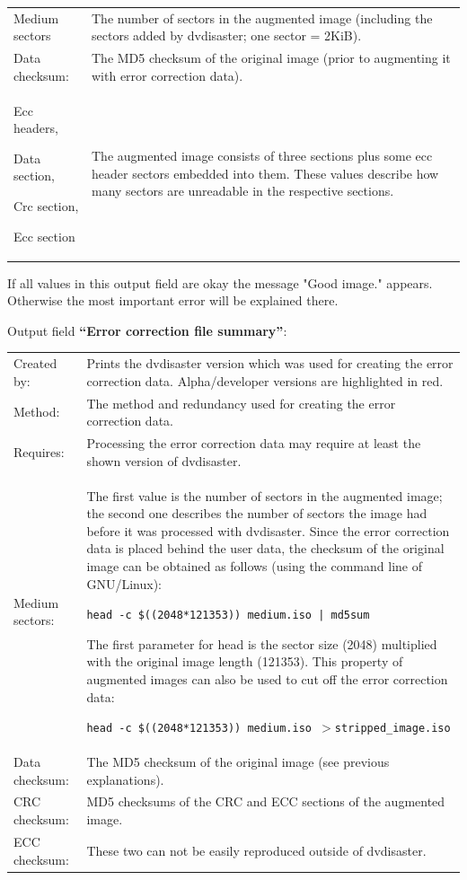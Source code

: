 \begin{tabular}{p{28mm}p{125mm}}
  Medium sectors  & 
  The number of sectors in the augmented image (including the sectors added by dvdisaster; 
  one sector = 2KiB). \\
  Data checksum: &
  The MD5 checksum of the original image (prior to augmenting it with error correction data). \\
  Ecc headers, \par
  Data section,\par
  Crc section, \par
  Ecc section  & 
  The augmented image consists of three sections plus some ecc header sectors 
  embedded into them. These values describe how many sectors are unreadable 
  in the respective sections. \\
\end{tabular}

\medskip

If all values in this output field are okay the 
message "\textcolor{dkgreen}{Good image.}" appears. 
Otherwise the most important error will be explained there. 
\newpage

Output field {\bf ``Error correction file summary''}:

\medskip

\begin{tabular}{lp{125mm}}
Created by: &
Prints the dvdisaster version which was used for creating the error 
correction data. Alpha/developer versions are highlighted in red. \\
Method: &
The method and redundancy used for creating the error correction data. \\
Requires: &
Processing the error correction data may require at least the shown version of dvdisaster. \\
Medium sectors: &
The first value is the number of sectors in the augmented image; 
the second one describes the number of sectors the image had before 
it was processed with dvdisaster. Since the error correction data is 
placed behind the user data, the checksum of the original image can be 
obtained as follows (using the command line of GNU/Linux):

\smallskip

{\tt head -c \$((2048*121353)) medium.iso | md5sum}

\smallskip

The first parameter for head is the sector size (2048) multiplied 
with the original image length (121353). This property of augmented images 
can also be used to cut off the error correction data:

\smallskip

{\tt head -c \$((2048*121353)) medium.iso $>$stripped\_image.iso}\\
Data checksum: &
The MD5 checksum of the original image (see previous explanations). \\
CRC checksum: & MD5 checksums of the CRC and ECC sections of the augmented image. \\
ECC checksum: & These two can not be easily reproduced outside of dvdisaster. \\
\end{tabular}


